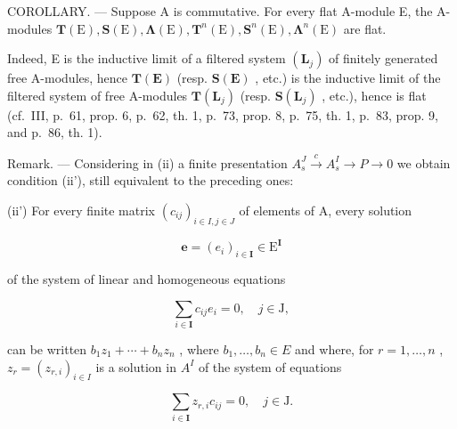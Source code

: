 COROLLARY. — Suppose A is commutative. For every flat A-module E, the A-modules \(\mathbf{T}(\mathrm{E}),\mathbf{S}(\mathrm{E}),\symbf{\Lambda}(\mathrm{E}),\mathbf{T}^{n}(\mathrm{E}),\mathbf{S}^{n}(\mathrm{E}),\symbf{\Lambda}^{n}(\mathrm{E})\) are flat.

Indeed, E is the inductive limit of a filtered system \((\mathbf{L}_{j})\) of finitely generated free A-modules, hence \(\mathbf{T}(\mathbf{E})\) (resp. \(\mathbf{S}(\mathbf{E})\) , etc.) is the inductive limit of the filtered system of free A-modules \(\mathbf{T}(\mathbf{L}_{j})\) (resp. \(\mathbf{S}(\mathbf{L}_{j})\) , etc.), hence is flat (cf.~III, p.~61, prop. 6, p.~62, th. 1, p.~73, prop. 8, p.~75, th. 1, p.~83, prop. 9, and p.~86, th. 1).

Remark. --- Considering in (ii) a finite presentation \(A_{s}^{J} \xrightarrow{c} A_{s}^{I} \to P \to 0\) we obtain condition (ii'), still equivalent to the preceding ones:

(ii') For every finite matrix \((c_{ij})_{i\in I,j\in J}\) of elements of A, every solution

\[
\pmb {e} = (e _ {i}) _ {i \in \mathbf {I}} \in \mathrm{E} ^ {\mathbf {I}}
\]

of the system of linear and homogeneous equations

\[
\sum_ {i \in \mathbf {I}} c _ {i j} e _ {i} = 0, \quad j \in \mathrm{J},
\]

can be written \(b_{1}z_{1}+\cdots+b_{n}z_{n}\) , where \(b_{1},\ldots,b_{n}\in E\) and where, for \(r=1,\ldots,n\) , \(z_{r}=(z_{r,i})_{i\in I}\) is a solution in \(A^{I}\) of the system of equations

\[
\sum_ {i \in \mathbf {I}} z _ {r, i} c _ {i j} = 0, \quad j \in \mathrm{J}.
\]


